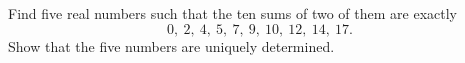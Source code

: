 Find five real numbers such that the ten sums of two of them are exactly
\[0,\ 2,\ 4,\ 5,\ 7,\ 9,\ 10,\ 12,\ 14,\ 17.\]
Show that the five numbers are uniquely determined.

